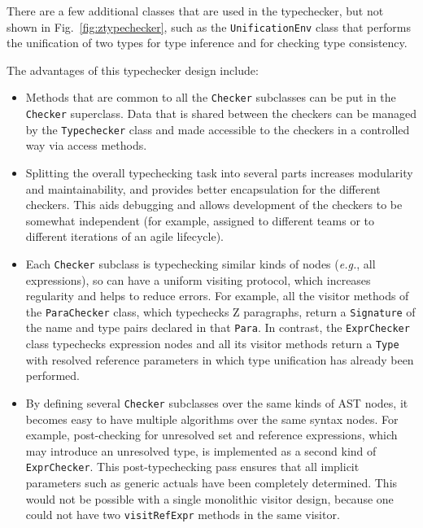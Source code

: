 \documentclass{llncs}
\begin{document}
There are a few additional classes that are used in the typechecker,
but not shown in Fig.~\ref{fig:ztypechecker}, such as the
\texttt{UnificationEnv} class that performs
the unification of two types for type inference and for checking type
consistency.

The advantages of this typechecker design include:
\begin{itemize}

\item Methods that are common to all the \texttt{Checker} subclasses can be put in
  the \texttt{Checker} superclass.  Data that is shared between the checkers
  can be managed by the \texttt{Typechecker} class and made accessible
  to the checkers in a controlled way via access methods.

\item Splitting the overall typechecking task into several parts increases
  modularity and maintainability, and provides better encapsulation
  for the different checkers.  This aids debugging and allows development
  of the checkers to be somewhat independent (for example, assigned to
  different teams or to different iterations of an agile lifecycle).

\item Each \texttt{Checker} subclass is typechecking similar kinds of
  nodes (\textit{e.g.}, all expressions), so can have a uniform visiting
  protocol, which increases regularity and helps to reduce errors.
  For example, all the visitor methods of the
  \texttt{ParaChecker} class, which typechecks Z paragraphs, return a
  \texttt{Signature} of the name and type pairs declared in that
  \texttt{Para}.  In contrast, the \texttt{ExprChecker} class
  typechecks expression nodes and all its visitor methods return a
  \texttt{Type} with resolved reference parameters in which type
  unification has already been performed.

\item By defining several \texttt{Checker} subclasses over the same kinds of
  AST nodes, it becomes easy to have multiple algorithms over the same
  syntax nodes.  For example, post-checking for unresolved set and
  reference expressions, which may introduce an unresolved type, is
  implemented as a second kind of \texttt{ExprChecker}. This post-typechecking
  pass ensures that all implicit parameters such as generic actuals
  have been completely determined.  This would not be possible with a
  single monolithic visitor design, because one could not have two
  \texttt{visitRefExpr} methods in the same visitor.

\end{itemize}
\end{document}
